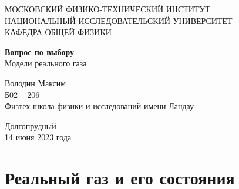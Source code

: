 \documentclass[a4paper, 14pt]{article}
\begin{document}
    \begin{titlepage}
        \begin{center}
        {\large МОСКОВСКИЙ ФИЗИКО-ТЕХНИЧЕСКИЙ ИНСТИТУТ \\ \vspace{5mm}
        НАЦИОНАЛЬНЫЙ ИССЛЕДОВАТЕЛЬСКИЙ УНИВЕРСИТЕТ \\ \vspace{5mm}
        КАФЕДРА ОБЩЕЙ ФИЗИКИ}
        \end{center}

        \begin{center}
        {\large}
        \end{center}

        \vspace{5cm}

        {\huge
            \begin{center}
            {\textbf{Вопрос по выбору}}
                \\
                Модели реального газа
            \end{center}
        }

        \vspace{2cm}

        \begin{flushright}
        {
            Володин Максим \\
            \vspace{2mm}
            Б02 -- 206 \\
            \vspace{2mm}
            Физтех-школа физики и исследований имени Ландау
        }
        \end{flushright}

        \tableofcontents \vspace{2.5cm}

        \begin{center}
            Долгопрудный \\
            14 июня 2023 года
        \end{center}

    \end{titlepage}


    \section*{Реальный газ и его состояния} 
\end{document}

